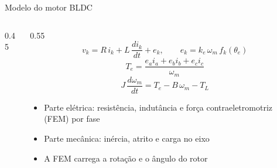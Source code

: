 
\begin{frame}{Modelo do motor BLDC}
  \begin{columns}[c]
    \begin{column}{0.45\textwidth}
      \centering
    \end{column}
    \begin{column}{0.55\textwidth}
      \[ v_{k} = R\,i_k + L\,\frac{di_k}{dt} + e_k,
         \qquad e_k = k_e\,\omega_m\,f_k(\theta_e) \]
      \[ T_e = \frac{e_a i_a + e_b i_b + e_c i_c}{\omega_m} \]
      \[ J\,\frac{d\omega_m}{dt} = T_e - B\,\omega_m - T_L \]
      \begin{itemize}
        \small
        \item Parte elétrica: resistência, indutância e força
              contraeletromotriz (FEM) por fase
        \item Parte mecânica: inércia, atrito e carga no eixo
        \item A FEM carrega a rotação e o ângulo do rotor
      \end{itemize}
    \end{column}
  \end{columns}
\end{frame}

